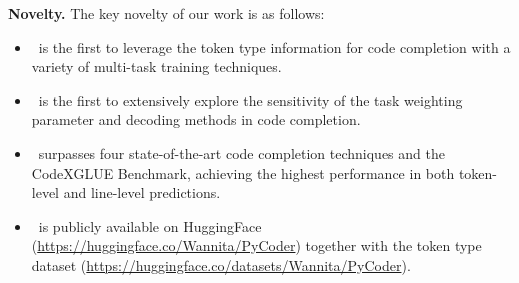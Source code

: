 



\textbf{Novelty.} The key novelty of our work is as follows:
\begin{itemize}
    \item \our~is the first to leverage the token type information for code completion with a variety of multi-task training techniques.
    \item \our~is the first to extensively explore the sensitivity of the task weighting parameter and decoding methods in code completion.
    \item \our~surpasses four state-of-the-art code completion techniques and the CodeXGLUE Benchmark, achieving the highest performance in both token-level and line-level predictions.
    \item \our~is publicly available on HuggingFace (\url{https://huggingface.co/Wannita/PyCoder}) together with the token type dataset (\url{https://huggingface.co/datasets/Wannita/PyCoder}).
\end{itemize}

